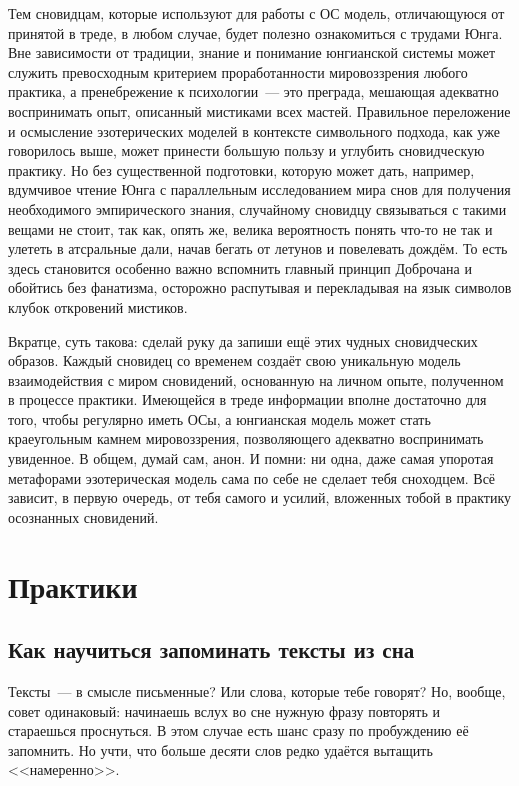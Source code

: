 \documentclass[a4paper,14pt,oneside]{memoir}
\begin{document}
Тем сновидцам, которые используют для работы с ОС модель, отличающуюся от принятой в треде, в любом случае, будет полезно ознакомиться с трудами Юнга. Вне зависимости от традиции, знание и понимание юнгианской системы может служить превосходным критерием проработанности мировоззрения любого практика, а пренебрежение к психологии~--- это преграда, мешающая адекватно воспринимать опыт, описанный мистиками всех мастей. Правильное переложение и осмысление эзотерических моделей в контексте символьного подхода, как уже говорилось выше, может принести большую пользу и углубить сновидческую практику. Но без существенной подготовки, которую может дать, например, вдумчивое чтение Юнга с параллельным исследованием мира снов для получения необходимого эмпирического знания, случайному сновидцу связываться с такими вещами не стоит, так как, опять же, велика вероятность понять что-то не так и улететь в атсральные дали, начав бегать от летунов и повелевать дождём. То есть здесь становится особенно важно вспомнить главный принцип Доброчана и обойтись без фанатизма, осторожно распутывая и перекладывая на язык символов клубок откровений мистиков.

Вкратце, суть такова: сделай руку да запиши ещё этих чудных сновидческих образов. Каждый сновидец со временем создаёт свою уникальную модель взаимодействия с миром сновидений, основанную на личном опыте, полученном в процессе практики. Имеющейся в треде информации вполне достаточно для того, чтобы регулярно иметь ОСы, а юнгианская модель может стать краеугольным камнем мировоззрения, позволяющего адекватно воспринимать увиденное. В общем, думай сам, анон. И помни: ни одна, даже самая упоротая метафорами эзотерическая модель сама по себе не сделает тебя сноходцем. Всё зависит, в первую очередь, от тебя самого и усилий, вложенных тобой в практику осознанных сновидений.




\part{Практики}


\chapter{Как научиться запоминать тексты из сна}
Тексты~--- в смысле письменные? Или слова, которые тебе говорят? 
Но, вообще, совет одинаковый: начинаешь вслух во сне нужную фразу повторять и стараешься проснуться. В этом случае есть шанс сразу по пробуждению её запомнить. Но учти, что больше десяти слов редко удаётся вытащить <<намеренно>>. 
\end{document}
